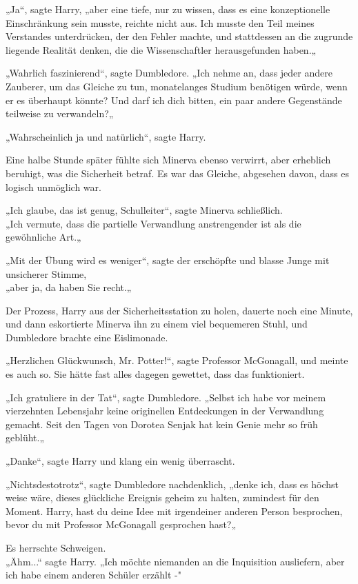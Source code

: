 {„Ja“, sagte Harry, „aber eine tiefe, nur zu wissen, dass es eine konzeptionelle Einschränkung sein musste, reichte nicht aus. Ich musste den Teil meines Verstandes unterdrücken, der den Fehler machte, und stattdessen an die zugrunde liegende Realität denken, die die Wissenschaftler herausgefunden haben.„

„Wahrlich faszinierend“, sagte Dumbledore. „Ich nehme an, dass jeder andere Zauberer, um das Gleiche zu tun, monatelanges Studium benötigen würde, wenn er es überhaupt könnte? Und darf ich dich bitten, ein paar andere Gegenstände teilweise zu verwandeln?„

„Wahrscheinlich ja und natürlich“, sagte Harry.

Eine halbe Stunde später fühlte sich Minerva ebenso verwirrt, aber erheblich beruhigt, was die Sicherheit betraf. Es war das Gleiche, abgesehen davon, dass es logisch unmöglich war.

„Ich glaube, das ist genug, Schulleiter“, sagte Minerva schließlich.\\ „Ich vermute, dass die partielle Verwandlung anstrengender ist als die gewöhnliche Art.„

„Mit der Übung wird es weniger“, sagte der erschöpfte und blasse Junge mit unsicherer Stimme,\\ „aber ja, da haben Sie recht.„

Der Prozess, Harry aus der Sicherheitsstation zu holen, dauerte noch eine Minute, und dann eskortierte Minerva ihn zu einem viel bequemeren Stuhl, und Dumbledore brachte eine Eislimonade.

„Herzlichen Glückwunsch, Mr. Potter!“, sagte Professor McGonagall, und meinte es auch so. Sie hätte fast alles dagegen gewettet, dass das funktioniert.

„Ich gratuliere in der Tat“, sagte Dumbledore. „Selbst ich habe vor meinem vierzehnten Lebensjahr keine originellen Entdeckungen in der Verwandlung gemacht. Seit den Tagen von Dorotea Senjak hat kein Genie mehr so früh geblüht.„

„Danke“, sagte Harry und klang ein wenig überrascht.

„Nichtsdestotrotz“, sagte Dumbledore nachdenklich, „denke ich, dass es höchst weise wäre, dieses glückliche Ereignis geheim zu halten, zumindest für den Moment. Harry, hast du deine Idee mit irgendeiner anderen Person besprochen, bevor du mit Professor McGonagall gesprochen hast?„

Es herrschte Schweigen.\\ „Ähm...“ sagte Harry. „Ich möchte niemanden an die Inquisition ausliefern, aber ich habe einem anderen Schüler erzählt -"

}
